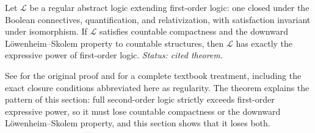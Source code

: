 \begin{theorem}[Lindstr\"om]
\label{thm:lindstrom}
Let \(\mathcal L\) be a regular abstract logic extending first-order
logic: one closed under the Boolean connectives, quantification, and
relativization, with satisfaction invariant under isomorphism.  If
\(\mathcal L\) satisfies countable compactness and the downward
L\"owenheim--Skolem property to countable structures, then
\(\mathcal L\) has exactly the expressive power of first-order logic.
\textit{Status: cited theorem.}
\end{theorem}

See \cite{Lindstrom1969} for the original proof and
\cite[Chapter~XIII]{EbbinghausFlumThomas1994} for a complete textbook
treatment, including the exact closure conditions abbreviated here as
regularity.  The theorem explains the pattern of this section: full
second-order logic strictly exceeds first-order expressive power, so it
must lose countable compactness or the downward L\"owenheim--Skolem
property, and this section shows that it loses both.

